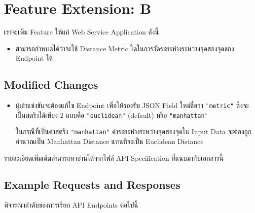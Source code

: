 
%

\section{Feature Extension: B}

\noindent
เราจะเพิ่ม Feature ให้แก่ Web Service Application ดังนี้
\begin{itemize}[topsep=0pc,itemsep=0pc]
\item  
    สามารถกำหนดได้ว่าจะใช้ Distance Metric ใดในการวัดระยะห่างระหว่างจุดสองจุดของ Endpoint  ได้
\end{itemize}

\subsection{Modified Changes}

\begin{itemize}[parsep=0.5pc]
\item 
    ผู้เข้าแข่งขันจะต้องแก้ไข Endpoint  เพื่อให้รองรับ JSON Field ใหม่ชื่อว่า \lstinline{"metric"} ซึ่งจะเป็นสตริงได้เพียง 2 แบบคือ \lstinline{"euclidean"} (default) หรือ \lstinline{"manhattan"}

    ในกรณีที่เป็นค่าสตริง \lstinline{"manhattan"} ค่าระยะห่างระหว่างจุดสองจุดใน Input Data จะต้องถูกคำนวณเป็น Manhattan Distance แทนที่จะเป็น Euclidean Distance
\end{itemize}

\noindent
รายละเอียดเพิ่มเติมสามารถหาอ่านได้จากไฟล์ API Specification ที่แนบมากับเอกสารนี้

\subsection{Example Requests and Responses}

\noindent
พิจารณาลำดับของการเรียก API Endpoints ต่อไปนี้

